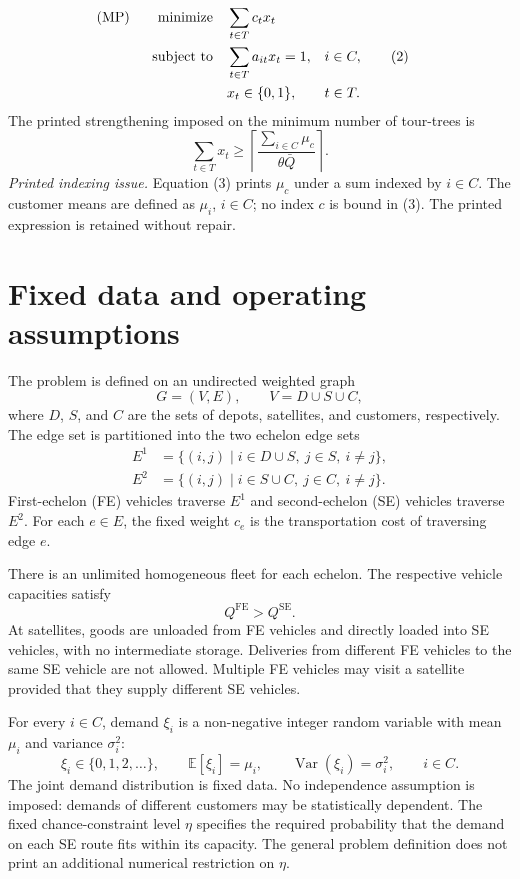 \documentclass{article}
\begin{document}
\begin{align}
\text{(MP)}\qquad \text{minimize}\quad &\sum_{t\in T}c_t x_t \notag\\
\text{subject to}\quad &\sum_{t\in T}a_{it}x_t=1, &&i\in C, \tag{2}\\
&x_t\in\{0,1\}, &&t\in T. \notag
\end{align}
The printed strengthening imposed on the minimum number of tour-trees is
\begin{equation}
\sum_{t\in T}x_t\geq
\left\lceil\frac{\sum_{i\in C}\mu_c}{\theta\bar Q}\right\rceil.
\tag{3}
\end{equation}
\noindent\textit{Printed indexing issue.} Equation (3) prints $\mu_c$ under a sum indexed by $i\in C$. The customer means are defined as $\mu_i$, $i\in C$; no index $c$ is bound in (3). The printed expression is retained without repair.

\section*{Fixed data and operating assumptions}
The problem is defined on an undirected weighted graph
\[
G=(V,E),\qquad V=D\cup S\cup C,
\]
where $D$, $S$, and $C$ are the sets of depots, satellites, and customers, respectively. The edge set is partitioned into the two echelon edge sets
\begin{align*}
E^1&=\{(i,j)\mid i\in D\cup S,\ j\in S,\ i\neq j\},\\
E^2&=\{(i,j)\mid i\in S\cup C,\ j\in C,\ i\neq j\}.
\end{align*}
First-echelon (FE) vehicles traverse $E^1$ and second-echelon (SE) vehicles traverse $E^2$. For each $e\in E$, the fixed weight $c_e$ is the transportation cost of traversing edge $e$.

There is an unlimited homogeneous fleet for each echelon. The respective vehicle capacities satisfy
\[
Q^{\mathrm{FE}}>Q^{\mathrm{SE}}.
\]
At satellites, goods are unloaded from FE vehicles and directly loaded into SE vehicles, with no intermediate storage. Deliveries from different FE vehicles to the same SE vehicle are not allowed. Multiple FE vehicles may visit a satellite provided that they supply different SE vehicles.

For every $i\in C$, demand $\xi_i$ is a non-negative integer random variable with mean $\mu_i$ and variance $\sigma_i^2$:
\[
\xi_i\in\{0,1,2,\ldots\},\qquad
\mathbb E[\xi_i]=\mu_i,\qquad
\operatorname{Var}(\xi_i)=\sigma_i^2,
\qquad i\in C.
\]
The joint demand distribution is fixed data. No independence assumption is imposed: demands of different customers may be statistically dependent. The fixed chance-constraint level $\eta$ specifies the required probability that the demand on each SE route fits within its capacity. The general problem definition does not print an additional numerical restriction on $\eta$.
\end{document}
